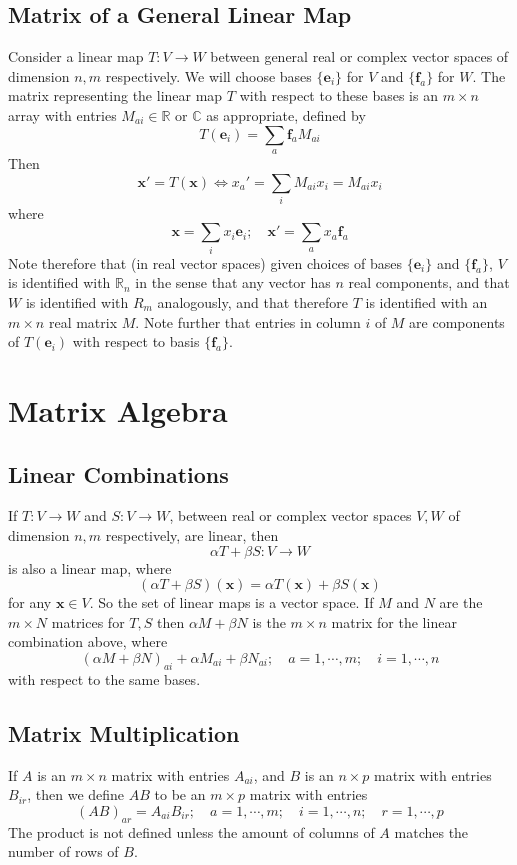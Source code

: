 \documentclass{article}
\begin{document}
	\subsection{Matrix of a General Linear Map}
	Consider a linear map $T: V \to W$ between general real or complex vector spaces of dimension $n, m$ respectively. We will choose bases $\{ \bm e_i \}$ for $V$ and $\{ \bm f_a \}$ for $W$. The matrix representing the linear map $T$ with respect to these bases is an $m \times n$ array with entries $M_{ai} \in \mathbb R$ or $\mathbb C$ as appropriate, defined by
	\[ T(\bm e_i) = \sum_a \bm f_a M_{ai} \]
	Then
	\[ \bm x' = T(\bm x) \iff x_a' = \sum_i M_{ai}x_i = M_{ai}x_i \]
	where
	\[ \bm x = \sum_i x_i \bm e_i;\quad \bm x' = \sum_a x_a \bm f_a \]
	Note therefore that (in real vector spaces) given choices of bases $\{ \bm e_i \}$ and $\{ \bm f_a \}$, $V$ is identified with $\mathbb R_n$ in the sense that any vector has $n$ real components, and that $W$ is identified with $R_m$ analogously, and that therefore $T$ is identified with an $m\times n$ real matrix $M$. Note further that entries in column $i$ of $M$ are components of $T(\bm e_i)$ with respect to basis $\{ \bm f_a \}$.

	\section{Matrix Algebra}
	\subsection{Linear Combinations}
	If $T: V \to W$ and $S: V \to W$, between real or complex vector spaces $V, W$ of dimension $n, m$ respectively, are linear, then
	\[ \alpha T + \beta S: V \to W \]
	is also a linear map, where
	\[ (\alpha T + \beta S)(\bm x) = \alpha T(\bm x) + \beta S(\bm x) \]
	for any $\bm x \in V$. So the set of linear maps is a vector space. If $M$ and $N$ are the $m\times N$ matrices for $T, S$ then $\alpha M + \beta N$ is the $m\times n$ matrix for the linear combination above, where
	\[ (\alpha M + \beta N)_{ai} + \alpha M_{ai} + \beta N_{ai};\quad a = 1, \cdots, m;\quad i = 1, \cdots, n \]
	with respect to the same bases.

	\subsection{Matrix Multiplication}
	If $A$ is an $m\times n$ matrix with entries $A_{ai}$, and $B$ is an $n \times p$ matrix with entries $B_{ir}$, then we define $AB$ to be an $m \times p$ matrix with entries
	\[ (AB)_{ar} = A_{ai}B_{ir};\quad a = 1, \cdots, m;\quad i = 1, \cdots, n;\quad r = 1, \cdots, p \]
	The product is not defined unless the amount of columns of $A$ matches the number of rows of $B$.
	
\end{document}
